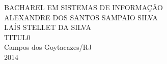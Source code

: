 \begin{titlepage}
 \begin{figure}[ht]
 \centering
 \end{figure}
 \begin{center}
   {\large BACHAREL EM SISTEMAS DE INFORMAÇÃO} \\ [3.5cm]
   {\large ALEXANDRE DOS SANTOS SAMPAIO SILVA} \\ [1cm]
   {\large LAÍS STELLET DA SILVA} \\ [2cm]
   {\large TITUL0 } \\
   \vfill
   {\large Campos dos Goytacazes/RJ} \\
   {\large 2014}
 \end{center}
\end{titlepage}